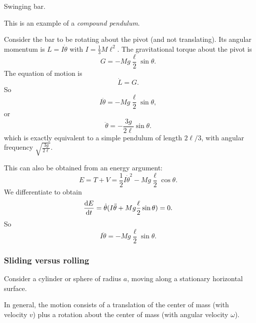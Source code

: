 \documentclass[a4paper]{article}
\begin{document}
\begin{eg}
  Swinging bar.
  \begin{center}
  \end{center}
  This is an example of a \emph{compound pendulum}.

  Consider the bar to be rotating about the pivot (and not translating). Its angular momentum is $L = I\dot{\theta}$ with $I = \frac{1}{3}M\ell^2$. The gravitational torque about the pivot is
  \[
    G = - Mg\frac{\ell}{2} \sin \theta.
  \]
  The equation of motion is
  \[
    \dot{L} = G.
  \]
  So
  \[
    I\ddot{\theta} = -Mg \frac{\ell}{2}\sin \theta,
  \]
  or
  \[
    \ddot{\theta} = -\frac{3g}{2\ell} \sin \theta.
  \]
  which is exactly equivalent to a simple pendulum of length $2\ell/3$, with angular frequency $\sqrt{\frac{3g}{2\ell}}$.

  This can also be obtained from an energy argument:
  \[
    E = T + V = \frac{1}{2}I\dot{\theta}^2  - Mg\frac{\ell}{2}\cos\theta.
  \]
  We differentiate to obtain
  \[
    \frac{\mathrm{d} E}{\mathrm{d} t} = \dot{\theta}(I\ddot{\theta} + Mg \frac{\ell}{2}\sin \theta) = 0.
  \]
  So
  \[
    I\ddot{\theta} = -Mg \frac{\ell}{2}\sin \theta.
  \]
\end{eg}

\subsubsection*{Sliding versus rolling}
Consider a cylinder or sphere of radius $a$, moving along a stationary horizontal surface.
\begin{center}
\end{center}

In general, the motion consists of a translation of the center of mass (with velocity $v$) plus a rotation about the center of mass (with angular velocity $\omega$).
\end{document}
